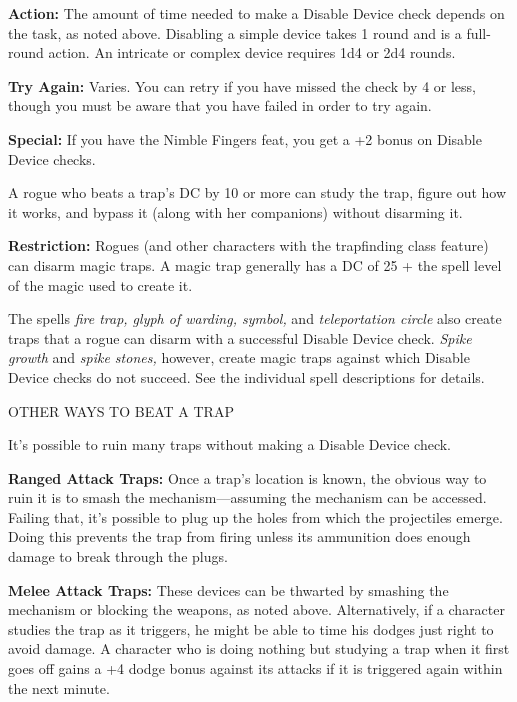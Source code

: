 \documentclass{article}
\begin{document}
\vspace{12pt}
\textbf{Action:} The amount of time needed to make a Disable Device check depends 
on the task, as noted above. Disabling a simple device takes 1 round and is a full-round 
action. An intricate or complex device requires 1d4 or 2d4 rounds.

\textbf{Try Again:} Varies. You can retry if you have missed the check by 4 or 
less, though you must be aware that you have failed in order to try again.

\textbf{Special:} If you have the Nimble Fingers feat, you get a +2 bonus on Disable 
Device checks.

A rogue who beats a trap's DC by 10 or more can study the trap, figure out how 
it works, and bypass it (along with her companions) without disarming it.

\textbf{Restriction:} Rogues (and other characters with the trapfinding class feature) 
can disarm magic traps. A magic trap generally has a DC of 25 + the spell level 
of the magic used to create it.

The spells \textit{fire trap, glyph of warding, symbol, }and \textit{teleportation 
circle }also create traps that a rogue can disarm with a successful Disable Device 
check. \textit{Spike growth }and \textit{spike stones, }however, create magic traps 
against which Disable Device checks do not succeed. See the individual spell descriptions 
for details.

\vspace{12pt}
OTHER WAYS TO BEAT A TRAP

It's possible to ruin many traps without making a Disable Device check.

\textbf{Ranged Attack Traps: }Once a trap's location is known, the obvious way 
to ruin it is to smash the mechanism---assuming the mechanism can be accessed. 
Failing that, it's possible to plug up the holes from which the projectiles emerge. 
Doing this prevents the trap from firing unless its ammunition does enough damage 
to break through the plugs.

\textbf{Melee Attack Traps: }These devices can be thwarted by smashing the mechanism 
or blocking the weapons, as noted above. Alternatively, if a character studies 
the trap as it triggers, he might be able to time his dodges just right to avoid 
damage. A character who is doing nothing but studying a trap when it first goes 
off gains a +4 dodge bonus against its attacks if it is triggered again within 
the next minute.
\end{document}
